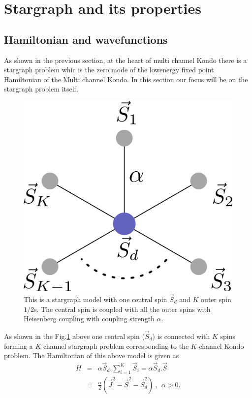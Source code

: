 \documentclass[reprint,prb,superscriptaddress]{revtex4-1}
\begin{document}
\tableofcontents

\section{Stargraph and its properties}
\subsection{Hamiltonian and wavefunctions}
\noindent As shown in the previous section, at the heart of multi channel Kondo there is a stargraph problem whic is the zero mode of the lowenergy fixed point Hamiltonian of the Multi channel Kondo. In this section our focus will be on the stargraph problem itself.
\begin{figure}[!h]
\centering
\includegraphics[scale=0.4]{plt/stargraph_first}
\caption{This is a stargraph model with one central spin $\vec{S}_d$ and $K$ outer spin $1/2$s. The central spin is coupled with all the outer spins with Heisenberg coupling with coupling strength $\alpha$.}
\label{fig:stargraph_first}
\end{figure}
As shown in the Fig.\ref{fig:stargraph_first} above one central spin ($\vec{S}_d$) is connected with $K$ spins forming a $K$ channel stargraph problem corresponding to the $K$-channel Kondo problem. The Hamiltonian of this above model is given as 
\begin{eqnarray}
H &=& \alpha \vec{S}_d.\sum_{i=1}^{K}\vec{S}_i=\alpha \vec{S}_d.\vec{S} \nonumber\\
&=& \frac{\alpha}{2} (\vec{J}^2-\vec{S}^2-\vec{S}_d^2)~,~~\alpha >0.
\end{eqnarray}
\end{document}

